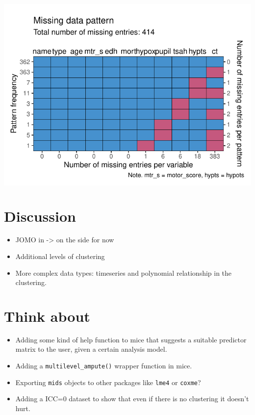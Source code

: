 \documentclass[
]{jss}
\begin{document}
\begin{CodeChunk}
\begin{center}\includegraphics{Manuscript_files/figure-latex/impact-3} \end{center}

\end{CodeChunk}

\hypertarget{discussion}{%
\section{Discussion}\label{discussion}}

\begin{itemize}
\item
  JOMO in  -\textgreater{} on the side for now
\item
  Additional levels of clustering
\item
  More complex data types: timeseries and polynomial relationship in the
  clustering.
\end{itemize}

\hypertarget{think-about}{%
\section{Think about}\label{think-about}}

\begin{itemize}
\item
  Adding some kind of help function to mice that suggests a suitable
  predictor matrix to the user, given a certain analysis model.
\item
  Adding a \texttt{multilevel\_ampute()} wrapper function in mice.
\item
  Exporting \texttt{mids} objects to other packages like \texttt{lme4}
  or \texttt{coxme}?
\item
  Adding a ICC=0 dataset to show that even if there is no clustering it
  doesn't hurt.
\end{itemize}

\renewcommand\refname{References}

\end{document}
